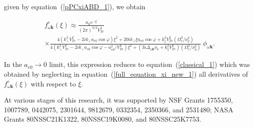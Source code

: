 \documentclass[draft]{agujournal2019}
\renewcommand{\vec}{\mathbf}
\begin{document}
{
given by equation~(\ref{pPCxiABD_1}), we obtain
\begin{linenomath*}
\begin{align}
&  f_{\omega\vec{k}}^{e}(\xi)\approx\frac{n_{0}e^{-\xi}}{\left(  2\pi\right)
^{3/2}V_{Te}^{3}}\nonumber\\
&  \times\frac{4\left(  k_{\perp}^{2}V_{Te}^{2}-2ik_{\perp}a_{e0}\cos
\varphi\right)  \xi^{2}+20ik_{\perp}\xi a_{e0}\cos\varphi+k_{\|}%
^{2}V_{Te}^{2}(\Omega_{e}^{2}/\nu_{0}^{2})}{4\left(  k_{\perp}^{2}V_{Te}^{2}
-2ik_{\perp}a_{e0}\cos\varphi-a_{e0}^{2}/V_{Te}^{2}\right)  \xi^{2}+\left(
3i\Delta_{\omega\vec{k}}\nu_{0}+k_{\|}^{2}V_{Te}^{2}\right)
(\Omega_{e}^{2}/\nu_{0}^{2})}\ \phi_{\omega\vec{k}}.
\label{Final_f(xi)}
\end{align}
\end{linenomath*}
In the $a_{e0}\rightarrow0$ limit, this expression reduces to
equation~(\ref{classical_1}) which was obtained by neglecting in
equation~(\ref{full_equation_xi_new_1}) all derivatives of $f_{\omega\vec{k}}^{e}(\xi)$ with respect to $\xi$.


\acknowledgments
At various stages of this research, it was supported by NSF Grants 1755350, 1007789, 0442075, 2301644, 9812679,  0332354,
2350366, and 2531480; NASA Grants 80NSSC21K1322, 80NSSC19K0080, and 80NSSC25K7753.


%
%

%



}
\end{document}
